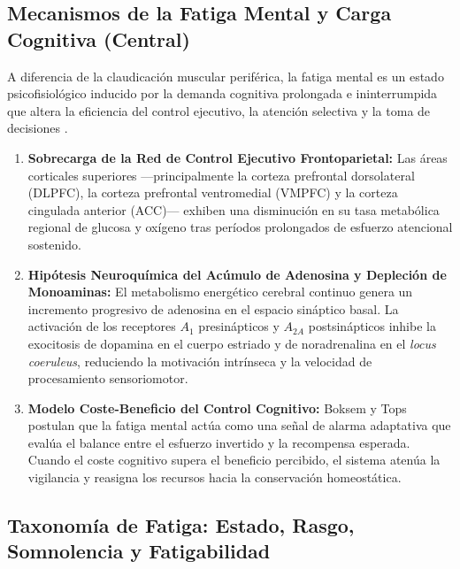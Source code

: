 \subsection{Mecanismos de la Fatiga Mental y Carga Cognitiva (Central)}

A diferencia de la claudicación muscular periférica, la fatiga mental es un estado psicofisiológico inducido por la demanda cognitiva prolongada e ininterrumpida que altera la eficiencia del control ejecutivo, la atención selectiva y la toma de decisiones \cite{boksem2005effects}.

\begin{enumerate}
    \item \textbf{Sobrecarga de la Red de Control Ejecutivo Frontoparietal:} Las áreas corticales superiores ---principalmente la corteza prefrontal dorsolateral (DLPFC), la corteza prefrontal ventromedial (VMPFC) y la corteza cingulada anterior (ACC)--- exhiben una disminución en su tasa metabólica regional de glucosa y oxígeno tras períodos prolongados de esfuerzo atencional sostenido.
    \item \textbf{Hipótesis Neuroquímica del Acúmulo de Adenosina y Depleción de Monoaminas:} El metabolismo energético cerebral continuo genera un incremento progresivo de adenosina en el espacio sináptico basal. La activación de los receptores $A_1$ presinápticos y $A_{2A}$ postsinápticos inhibe la exocitosis de dopamina en el cuerpo estriado y de noradrenalina en el \textit{locus coeruleus}, reduciendo la motivación intrínseca y la velocidad de procesamiento sensoriomotor.
    \item \textbf{Modelo Coste-Beneficio del Control Cognitivo:} Boksem y Tops \cite{boksem2005effects} postulan que la fatiga mental actúa como una señal de alarma adaptativa que evalúa el balance entre el esfuerzo invertido y la recompensa esperada. Cuando el coste cognitivo supera el beneficio percibido, el sistema atenúa la vigilancia y reasigna los recursos hacia la conservación homeostática.
\end{enumerate}

\subsection{Taxonomía de Fatiga: Estado, Rasgo, Somnolencia y Fatigabilidad}

